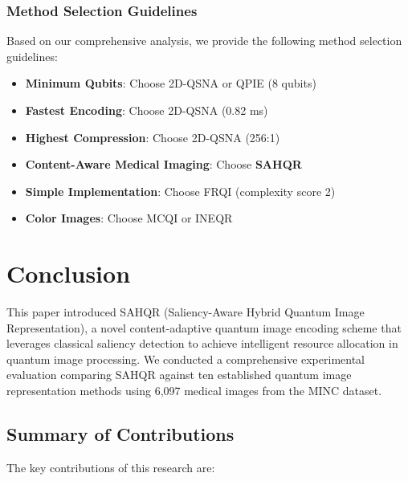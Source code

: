 \documentclass{ipol}
\begin{document}
\subsubsection{Method Selection Guidelines}

Based on our comprehensive analysis, we provide the following method selection guidelines:

\begin{itemize}
\item \textbf{Minimum Qubits}: Choose 2D-QSNA or QPIE (8 qubits)
\item \textbf{Fastest Encoding}: Choose 2D-QSNA (0.82 ms)
\item \textbf{Highest Compression}: Choose 2D-QSNA (256:1)
\item \textbf{Content-Aware Medical Imaging}: Choose \textbf{SAHQR}
\item \textbf{Simple Implementation}: Choose FRQI (complexity score 2)
\item \textbf{Color Images}: Choose MCQI or INEQR
\end{itemize}

\section{Conclusion}\label{sec:conclusion}

This paper introduced SAHQR (Saliency-Aware Hybrid Quantum Image Representation), a novel content-adaptive quantum image encoding scheme that leverages classical saliency detection to achieve intelligent resource allocation in quantum image processing. We conducted a comprehensive experimental evaluation comparing SAHQR against ten established quantum image representation methods using 6,097 medical images from the MINC dataset.

\subsection{Summary of Contributions}

The key contributions of this research are:
\end{document}
